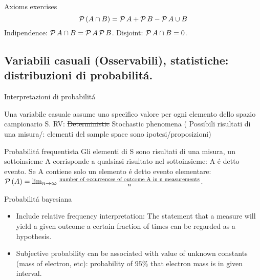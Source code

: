 \begin{wordonframe}{Axioms exercises}
\[\operatorname{\mathcal{P}}{(A\cap B)}=\operatorname{\mathcal{P}}{A}+\operatorname{\mathcal{P}}{B}-\operatorname{\mathcal{P}}{A\cup B}\]
Indipendence: $\operatorname{\mathcal{P}}{A\cap B}=\operatorname{\mathcal{P}}{A}\operatorname{\mathcal{P}}{B}$.
Disjoint: $\operatorname{\mathcal{P}}{A\cap B}=0$.
\end{wordonframe}

\subsection{Variabili casuali (Osservabili), statistiche: distribuzioni di probabilit\'a.}\label{ssec:RV}

\begin{frame}{Interpretazioni di probabilit\'a}
\begin{block}{Una variabile casuale assume uno specifico valore per ogni elemento dello spazio campionario S.}
RV: \sout{Deterministic} Stochastic phenomena ( Possibili risultati di una misura/: elementi del sample space sono ipotesi/proposizioni)
\end{block}
\begin{block}{Probabilit\'a frequentista}
Gli elementi di S sono risultati di una misura, un sottoinsieme A corrisponde a qualsiasi risultato nel sottoinsieme: A \'e detto evento. Se A contiene solo un elemento \'e detto evento elementare: $\operatorname{\mathcal{P}}{(A)}=\lim_{n\to\infty}\frac{\text{number of occurrences of outcome A in n measurements}}{n}$.
\end{block}
\begin{block}{Probabilit\'a bayesiana}

\begin{itemize}
\item Include relative frequency interpretation: The statement that a measure will yield a given outcome a certain fraction of times can be regarded as a hypothesis.
\item Subjective probability can be associated with value of unknown constants (mass of electron, etc): probability of $95\%$ that electron mass is in given interval.
\end{itemize}
\end{block}
\end{frame}

